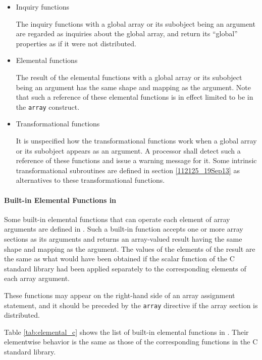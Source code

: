 \begin{itemize}
 \item Inquiry functions

       The inquiry functions with a global array or its subobject
       being an argument are regarded as inquiries about the global
       array, and return its ``global'' properties as if it were not
       distributed.

 \item Elemental functions

       The result of the elemental functions with a global array or
       its subobject being an argument has the same shape and
       mapping as the argument.
%
       Note that such a reference of these elemental functions is in
       effect limited to be in the {\tt array} construct.

 \item Transformational functions

       It is unspecified how the transformational functions work when a
       global array or its subobject appears as an argument.
%
       A processor shall detect such a reference of these functions
       and issue a warning message for it.
%
       Some intrinsic transformational subroutines are defined in
       section \ref{112125_19Sep13} as alternatives to these
       transformational functions.

\end{itemize}


\paragraph{Built-in Elemental Functions in {\XMPC}}
\label{094142_25Sep13}

Some built-in elemental functions that can operate each element of
array arguments are defined in {\XMPC}. Such a built-in function
accepts one or more array sections as its arguments and returns an
array-valued result having the same shape and mapping as the argument.
%
The values of the elements of the result are the same as what would have
been obtained if the scalar function of the C standard library had
been applied separately to the corresponding elements of each array
argument.

These functions may appear on the right-hand side of an array
assignment statement, and it should be preceded by the {\tt array}
directive if the array section is distributed.

Table \ref{tab:elemental_c} shows the list of built-in elemental
functions in {\XMPC}. Their elementwise behavior is the same as those of
the corresponding functions in the C standard library.

